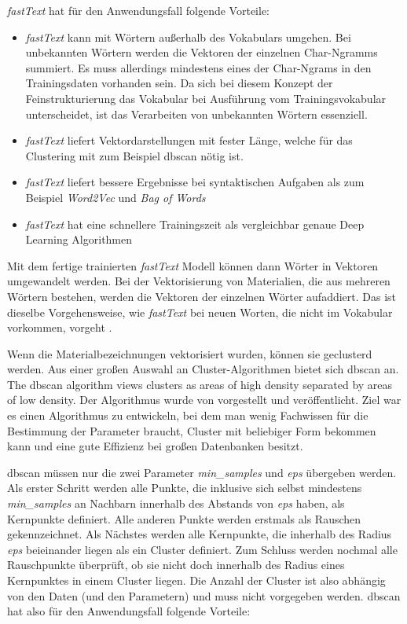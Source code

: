 \textit{fastText} hat für den Anwendungsfall folgende Vorteile:

\begin{itemize}
	\item \textit{fastText} kann mit Wörtern außerhalb des Vokabulars umgehen. Bei unbekannten Wörtern werden die Vektoren der einzelnen Char-Ngramms summiert. Es muss allerdings mindestens eines der Char-Ngrams in den Trainingsdaten vorhanden sein. \citep[vgl.][]{gensim_fastText,le2014distributed} Da sich bei diesem Konzept der Feinstrukturierung das Vokabular bei Ausführung vom Trainingsvokabular unterscheidet, ist das Verarbeiten von unbekannten Wörtern essenziell.
	\item \textit{fastText} liefert Vektordarstellungen mit fester Länge, welche für das Clustering mit zum Beispiel \ac{dbscan} nötig ist. \citep[vgl.][]{le2014distributed}
	\item \textit{fastText} liefert bessere Ergebnisse bei syntaktischen Aufgaben als zum Beispiel \textit{Word2Vec} und \textit{Bag of Words} \citep[vgl.][]{fastText_word2vec_comparison,le2014distributed}
	\item \textit{fastText} hat eine schnellere Trainingszeit als vergleichbar genaue Deep Learning Algorithmen \citep[vgl.][]{fastText_release2016}
\end{itemize}


Mit dem fertige trainierten \textit{fastText} Modell können dann Wörter in Vektoren umgewandelt werden. Bei der Vektorisierung von Materialien, die aus mehreren Wörtern bestehen, werden die Vektoren der einzelnen Wörter aufaddiert. Das ist dieselbe Vorgehensweise, wie \textit{fastText} bei neuen Worten, die nicht im Vokabular vorkommen, vorgeht \citep[vgl.][]{gensim_fastText}.

Wenn die Materialbezeichnungen vektorisiert wurden, können sie geclusterd werden. Aus einer großen Auswahl an Cluster-Algorithmen bietet sich \ac{dbscan} an. \glqq The \ac{dbscan} algorithm views clusters as areas of high density separated by areas of low density.\grqq{} \citep{scikitlearn_clustering} Der Algorithmus wurde \citeyear{Ester1996ADA} von \citeauthor{Ester1996ADA} vorgestellt und veröffentlicht. Ziel war es einen Algorithmus zu entwickeln, bei dem man wenig Fachwissen für die Bestimmung der Parameter braucht, Cluster mit beliebiger Form bekommen kann und eine gute Effizienz bei großen Datenbanken besitzt.

\ac{dbscan} müssen nur die zwei Parameter \textit{min\_samples} und \textit{eps} übergeben werden. Als erster Schritt werden alle Punkte, die inklusive sich selbst mindestens \textit{min\_samples} an Nachbarn innerhalb des Abstands von \textit{eps} haben, als Kernpunkte definiert. Alle anderen Punkte werden erstmals als Rauschen gekennzeichnet. Als Nächstes werden alle Kernpunkte, die inherhalb des Radius \textit{eps} beieinander liegen als ein Cluster definiert. Zum Schluss werden nochmal alle Rauschpunkte überprüft, ob sie nicht doch innerhalb des Radius eines Kernpunktes in einem Cluster liegen. \citep[vgl.][]{scikitlearn_clustering,Ester1996ADA} Die Anzahl der Cluster ist also abhängig von den Daten (und den Parametern) und muss nicht vorgegeben werden.
\ac{dbscan} hat also für den Anwendungsfall folgende Vorteile:

